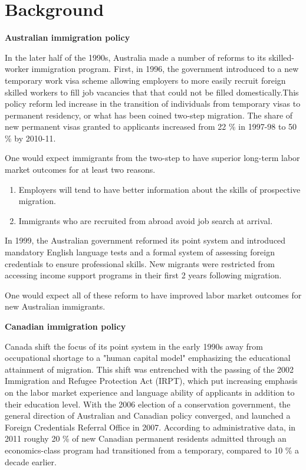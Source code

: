 \documentclass[../root]{subfiles}
\begin{document}
    
    
    \section{Background}
    
    {\bf Australian immigration policy} 
    
    In the later half of the 1990s, Australia made a number of reforms to its skilled-worker immigration program.
    First, in 1996, the government introduced to a new temporary work visa scheme allowing employers to more easily recruit foreign skilled workers to fill job vacancies that that could not be filled domestically.This policy reform led increase in the transition of individuals from temporary visas to permanent residency, or what has been coined two-step migration.  The share of new permanent visas granted to applicants increased from 22 \% in 1997-98 to 50 \% by 2010-11.  
    
    One would expect immigrants from the two-step to have superior long-term labor market outcomes for at least two reasons.
    \begin{enumerate}
        \item  Employers will tend to have better information about the skills of prospective migration.
        \item Immigrants who are recruited from abroad avoid job search at arrival. 
    \end{enumerate}
        
    In 1999, the Australian government reformed its point system and introduced mandatory English language tests and a formal system of assessing foreign credentials to ensure professional skills.
    New migrants were restricted from accessing income support programs in their first 2 years following migration.  
    
    One would expect all of these reform to have improved labor market outcomes for new Australian immigrants.
    
    {\bf Canadian immigration policy}
    
    Canada shift the focus of its point system in the early 1990s away from occupational shortage to a "human capital model" emphasizing the educational attainment of migration. This shift was entrenched with the passing of the 2002 Immigration and Refugee Protection Act (IRPT), which put increasing emphasis on the labor market experience and language ability of applicants in addition to their education level.
    With the 2006 election of a conservation government, the general direction of Australian and Canadian policy converged, and launched a Foreign Credentials Referral Office in 2007.
    According to administrative data, in 2011 roughy 20 \% of new Canadian permanent residents admitted through an economics-class program had transitioned from a temporary, compared to 10 \% a decade earlier. 
    
\end{document}
